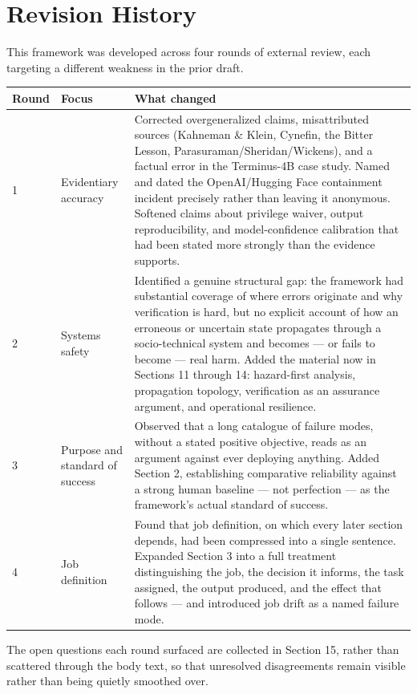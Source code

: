 \section*{Revision History}

This framework was developed across four rounds of external review, each targeting a different weakness in the prior draft.

\begin{center}
\begin{tabular}{|p{}|p{}|>{\small\raggedright\arraybackslash}p{}|}
\hline
Round & Focus & What changed \\
\hline
1 & Evidentiary accuracy & Corrected overgeneralized claims, misattributed sources (Kahneman \& Klein, Cynefin, the Bitter Lesson, Parasuraman/Sheridan/Wickens), and a factual error in the Terminus-4B case study. Named and dated the OpenAI/Hugging Face containment incident precisely rather than leaving it anonymous. Softened claims about privilege waiver, output reproducibility, and model-confidence calibration that had been stated more strongly than the evidence supports. \\
\hline
2 & Systems safety & Identified a genuine structural gap: the framework had substantial coverage of where errors originate and why verification is hard, but no explicit account of how an erroneous or uncertain state propagates through a socio-technical system and becomes --- or fails to become --- real harm. Added the material now in Sections 11 through 14: hazard-first analysis, propagation topology, verification as an assurance argument, and operational resilience. \\
\hline
3 & Purpose and standard of success & Observed that a long catalogue of failure modes, without a stated positive objective, reads as an argument against ever deploying anything. Added Section 2, establishing comparative reliability against a strong human baseline --- not perfection --- as the framework's actual standard of success. \\
\hline
4 & Job definition & Found that job definition, on which every later section depends, had been compressed into a single sentence. Expanded Section 3 into a full treatment distinguishing the job, the decision it informs, the task assigned, the output produced, and the effect that follows --- and introduced job drift as a named failure mode. \\
\hline
\end{tabular}
\end{center}

The open questions each round surfaced are collected in Section 15, rather than scattered through the body text, so that unresolved disagreements remain visible rather than being quietly smoothed over.
